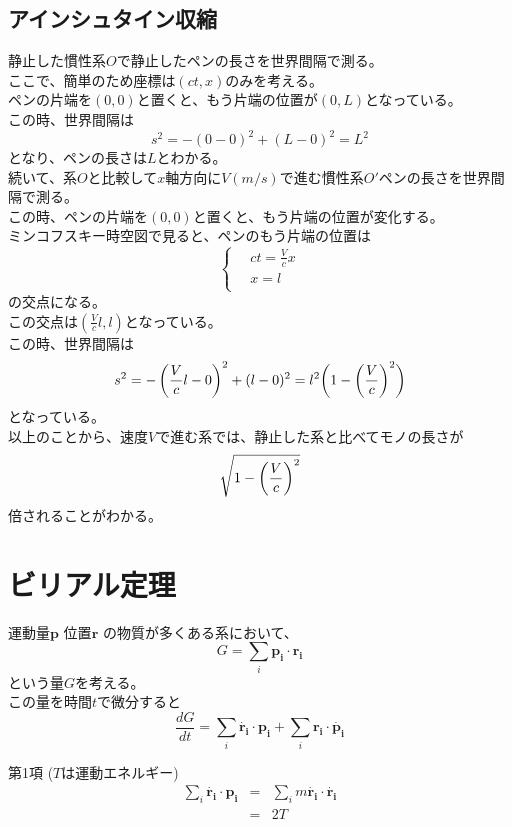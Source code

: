 \documentclass[dvipdfmx]{report} %
\begin{document}
\subsection{
    アインシュタイン収縮
}
静止した慣性系$O$で静止したペンの長さを世界間隔で測る。\\
ここで、簡単のため座標は$(ct, x)$のみを考える。\\
ペンの片端を$(0, 0)$と置くと、もう片端の位置が$(0, L)$となっている。\\
この時、世界間隔は
$$s^2 = - (0-0)^2 + (L-0)^2 = L^2$$
となり、ペンの長さは$L$とわかる。\\
続いて、系$O$と比較して$x$軸方向に$V(m/s)$で進む慣性系$O'$ペンの長さを世界間隔で測る。\\
この時、ペンの片端を$(0, 0)$と置くと、もう片端の位置が変化する。\\
ミンコフスキー時空図で見ると、ペンのもう片端の位置は
\begin{equation}
    \left\{ \,
        \begin{aligned}
        & ct = \frac{V}{c} x \\
        & x = l \\
        \end{aligned}
    \right.
\end{equation}
の交点になる。\\
この交点は$(\frac{V}{c} l, l)$となっている。\\
この時、世界間隔は
$$s^2 = - \left( \frac{V}{c} l - 0 \right) ^2 + (l-0)^2 = l^2 \biggl{(} 1- \biggl{(} \frac{V}{c} \biggr{)}^2 \biggr{)}$$
となっている。\\
以上のことから、速度$V$で進む系では、静止した系と比べてモノの長さが
$$\sqrt{1 - \biggl{(} \frac{V}{c} \biggr{)}^2}$$
倍されることがわかる。\\

\section{
    ビリアル定理
}
運動量$\bm{p}$ 位置$\bm{r}$ の物質が多くある系において、
$$
G = \sum_{i}{\bm{p_i} \cdot \bm{r_i}}
$$
という量$G$を考える。\\
この量を時間$t$で微分すると
$$\frac{dG}{dt} = \sum_{i} \dot{ \bm{r_i} } \cdot \bm{p_i} + \sum_{i} \bm{r_i} \cdot \dot{ \bm{p_i} }$$

\begin{tcolorbox}
第1項 ($T$は運動エネルギー)\\
\begin{eqnarray*}
 \sum_{i} \dot{ \bm{r_i} } \cdot \bm{p_i} &=& \sum_{i}  m \dot{ \bm{r_i} } \cdot  \dot{ \bm{r_i} }\\
 &=& 2T
\end{eqnarray*}
\end{tcolorbox}
\end{document}

